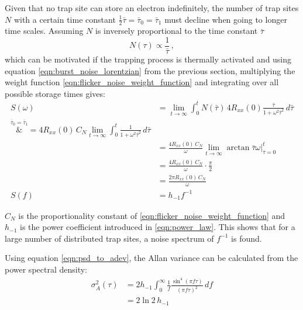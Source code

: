 Given that no trap site can store an electron indefinitely, the number of trap sites $N$ with a certain time constant $\frac 1 2 \bar \tau = \bar \tau_0 = \bar \tau_1$ must decline when going to longer time scales. Assuming $N$ is inversely proportional to the time constant $\bar \tau$
\begin{equation}
    N(\tau) \propto \frac{1}{\bar \tau}\,, \label{eqn:flicker_noise_weight_function}
\end{equation}
which can be motivated if the trapping process is thermally activated \cite{1_f_noise_motivation} and using equation \ref{eqn:burst_noise_lorentzian} from the previous section, multiplying the weight function \ref{eqn:flicker_noise_weight_function} and integrating over all possible storage times gives:
\begin{align}
    S(\omega) &= \lim_{t \to \infty} \int_0^t N(\bar \tau) \, 4 R_{xx}(0) \frac{\bar \tau}{1 + \omega^2 \bar \tau^2} \, d\bar\tau \nonumber\\
    \overset{\bar \tau_0 = \bar \tau_1}&{=} 4 R_{xx}(0)\, C_N \lim_{t \to \infty} \int_0^t \frac{1}{1 + \omega^2 \bar\tau^2} \, d\bar\tau \nonumber\\
    &= \frac{4 R_{xx}(0)\, C_N}{\omega} \lim_{t \to \infty}  \arctan{\bar\tau \omega} \Big|_{\bar\tau=0}^t \nonumber\\
    &= \frac{4 R_{xx}(0)\, C_N}{\omega} \cdot \frac{\pi}{2} \nonumber\\
    &= \frac{2 \pi R_{xx}(0)\, C_N}{\omega}\\
    S(f) &= h_{-1} f^{-1}
\end{align}

$C_N$ is the proportionality constant of \ref{eqn:flicker_noise_weight_function} and $h_{-1}$ is the power coefficient introduced in \ref{eqn:power_law}. This shows that for a large number of distributed trap sites, a noise spectrum of $f^{-1}$ is found.

Using equation \ref{eqn:psd_to_adev}, the Allan variance can be calculated from the power spectral density:
\begin{align}
    \sigma_A^2(\tau) &= 2 h_{-1} \int_0^\infty \frac{1}{f} \frac{\sin^4\left( \pi f \tau \right)}{(\pi f \tau)^2}\,df \nonumber\\
    &=2 \ln 2 \, h_{-1}
\end{align}

